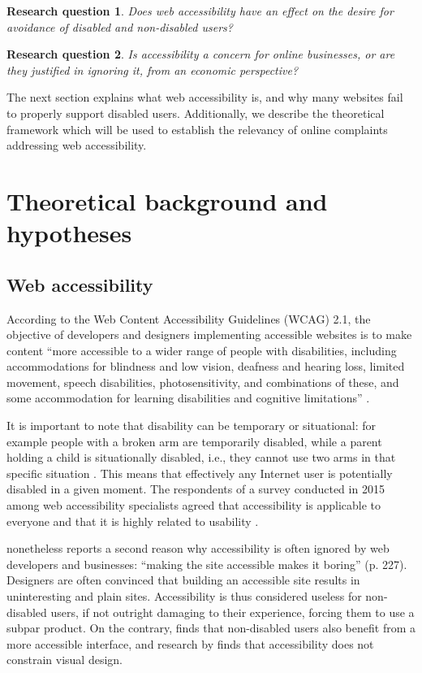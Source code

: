 \documentclass[12pt, a4paper]{article}
\newtheorem{req}{Research question}
\begin{document}
\begin{req}
  Does web accessibility have an effect on the desire for avoidance of disabled and non-disabled users?
\end{req}
\begin{req}
  Is accessibility a concern for online businesses, or are they justified in ignoring it, from an economic perspective?
\end{req}

The next section explains what web accessibility is, and why many websites fail to
properly support disabled users. Additionally, we describe the theoretical framework
which will be used to establish the relevancy of online complaints addressing web
accessibility.

\section{Theoretical background and hypotheses}

\subsection{Web accessibility}\label{sec:web-accessibility}

According to the Web Content Accessibility Guidelines (WCAG) 2.1, the objective of
developers and designers implementing accessible websites is to make content ``more
accessible to a wider range of people with disabilities, including accommodations for
blindness and low vision, deafness and hearing loss, limited movement, speech
disabilities, photosensitivity, and combinations of these, and some accommodation for
learning disabilities and cognitive limitations'' \cite[para. 1]{wcag21}.

It is important to note that disability can be temporary or situational: for example
people with a broken arm are temporarily disabled, while a parent holding a child is
situationally disabled, i.e., they cannot use two arms in that specific situation
\cite{henry2006}. This means that effectively any Internet user is potentially disabled
in a given moment. The respondents of a survey conducted in 2015 among web
accessibility specialists agreed that accessibility is applicable to everyone and that
it is highly related to usability \cite{yesilada2015}.

 nonetheless reports a second reason why accessibility is often
ignored by web developers and businesses: ``making the site accessible makes it
boring'' (p. 227). Designers are often convinced that building an accessible
site results in uninteresting and plain sites. Accessibility is thus considered useless
for non-disabled users, if not outright damaging to their experience, forcing them to
use a subpar product. On the contrary,  finds that
non-disabled users also benefit from a more accessible interface, and research by
 finds that accessibility does not constrain visual design.
\end{document}
